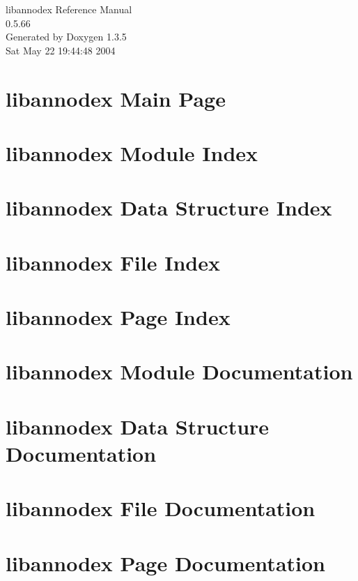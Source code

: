 \documentclass[a4paper]{book}
\begin{document}
\begin{titlepage}
\vspace*{7cm}
\begin{center}
{\Large libannodex Reference Manual\\[1ex]\large 0.5.66 }\\
\vspace*{1cm}
{\large Generated by Doxygen 1.3.5}\\
\vspace*{0.5cm}
{\small Sat May 22 19:44:48 2004}\\
\end{center}
\end{titlepage}
\clearemptydoublepage
{}
\tableofcontents
\clearemptydoublepage
{}
\chapter{libannodex Main Page}
\label{index}
\chapter{libannodex Module Index}

\chapter{libannodex Data Structure Index}

\chapter{libannodex File Index}

\chapter{libannodex Page Index}

\chapter{libannodex Module Documentation}










\chapter{libannodex Data Structure Documentation}


\chapter{libannodex File Documentation}













\chapter{libannodex Page Documentation}

\printindex
\end{document}
